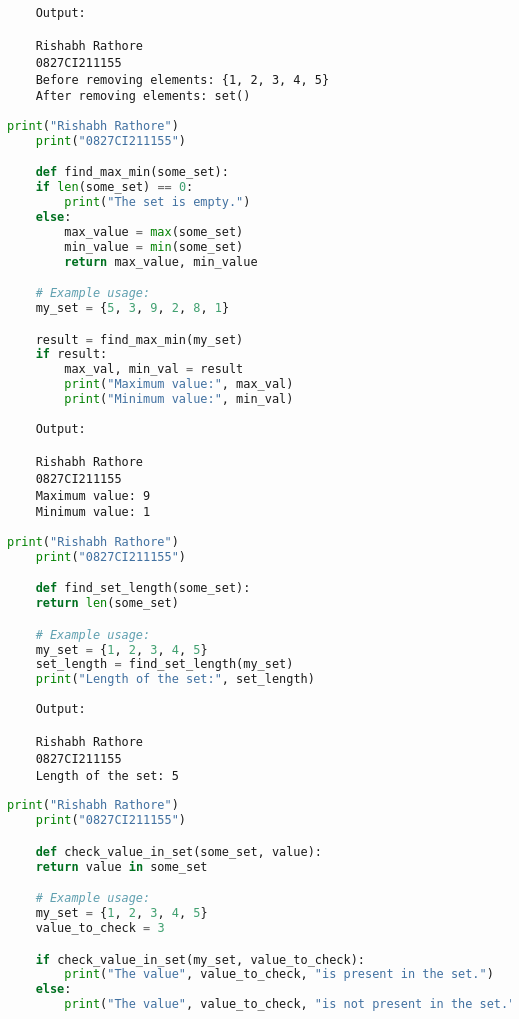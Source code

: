 \documentclass{report}
\begin{document}
\begin{verbatim}
	Output:

	Rishabh Rathore
	0827CI211155
	Before removing elements: {1, 2, 3, 4, 5}
	After removing elements: set()

\end{verbatim}


\bigskip


\sol 
\begin{lstlisting}[language=Python]
	print("Rishabh Rathore")
	print("0827CI211155")

	def find_max_min(some_set):
    if len(some_set) == 0:
        print("The set is empty.")
    else:
        max_value = max(some_set)
        min_value = min(some_set)
        return max_value, min_value

	# Example usage:
	my_set = {5, 3, 9, 2, 8, 1}

	result = find_max_min(my_set)
	if result:
		max_val, min_val = result
		print("Maximum value:", max_val)
		print("Minimum value:", min_val)
\end{lstlisting}

\begin{verbatim}
	Output:

	Rishabh Rathore
	0827CI211155
	Maximum value: 9
	Minimum value: 1

\end{verbatim}


\bigskip


\sol 
\begin{lstlisting}[language=Python]
	print("Rishabh Rathore")
	print("0827CI211155")

	def find_set_length(some_set):
    return len(some_set)

	# Example usage:
	my_set = {1, 2, 3, 4, 5}
	set_length = find_set_length(my_set)
	print("Length of the set:", set_length)
\end{lstlisting}

\begin{verbatim}
	Output:

	Rishabh Rathore
	0827CI211155
	Length of the set: 5

\end{verbatim}


\bigskip


\sol 
\begin{lstlisting}[language=Python]
	print("Rishabh Rathore")
	print("0827CI211155")

	def check_value_in_set(some_set, value):
    return value in some_set

	# Example usage:
	my_set = {1, 2, 3, 4, 5}
	value_to_check = 3

	if check_value_in_set(my_set, value_to_check):
		print("The value", value_to_check, "is present in the set.")
	else:
		print("The value", value_to_check, "is not present in the set.")
\end{lstlisting}
\end{document}
